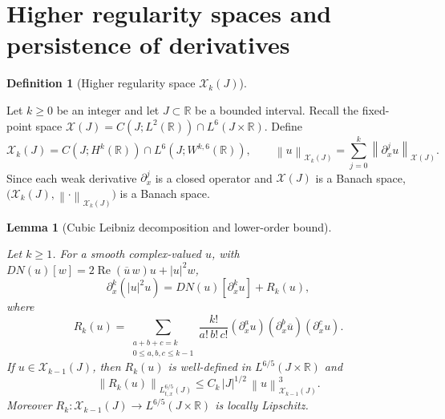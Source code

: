\documentclass[11pt,oneside]{book}
\providecommand{\uses}[1]{}
\newtheorem{lemma}[theorem]{Lemma}
\theoremstyle{definition}
\newtheorem{definition}[theorem]{Definition}
\theoremstyle{remark}
\newcommand{\R}{\mathbb R}
\newcommand{\1}{\mathbf 1}
\newcommand{\Rea}{\operatorname{Re}}
\newcommand{\norm}[1]{\left\lVert #1\right\rVert}
\begin{document}
\section{Higher regularity spaces and persistence of derivatives}

\begin{definition}[Higher regularity space $\mathcal X_k(J)$]
\label{def:Xk-space}
\uses{def:fixed-point-space, def:Hs-space}
Let $k\ge0$ be an integer and let $J\subset\R$ be a bounded interval.  Recall
the fixed-point space $\mathcal X(J)=C(J;L^2(\R))\cap L^6(J\times\R)$.  Define
\[
 \mathcal X_k(J)=C(J;H^k(\R))\cap L^6(J;W^{k,6}(\R)),
 \qquad
 \norm u_{\mathcal X_k(J)}
 =\sum_{j=0}^k\norm{\partial_x^ju}_{\mathcal X(J)}.
\]
Since each weak derivative $\partial_x^j$ is a closed operator and
$\mathcal X(J)$ is a Banach space, $\bigl(\mathcal X_k(J),\norm\cdot_{\mathcal X_k(J)}\bigr)$
is a Banach space.
\end{definition}

\begin{lemma}[Cubic Leibniz decomposition and lower-order bound]
\label{lem:cubic-Hk-leibniz}
\uses{def:Xk-space, def:scalar-mixed-norm, lem:cubic-derivative-map}
Let $k\ge1$.  For a smooth complex-valued $u$, with
$DN(u)[w]=2\Rea(\overline u\,w)u+|u|^2w$,
\begin{equation}
 \partial_x^k(|u|^2u)=DN(u)[\partial_x^ku]+R_k(u),
 \label{eq:top-derivative-split}
\end{equation}
where
\begin{equation}
 R_k(u)=
 \sum_{\substack{a+b+c=k\\0\le a,b,c\le k-1}}
 \frac{k!}{a!\,b!\,c!}
 (\partial_x^au)(\partial_x^b\overline u)(\partial_x^cu).
 \label{eq:Rk-explicit}
\end{equation}
If $u\in\mathcal X_{k-1}(J)$, then $R_k(u)$ is well-defined in
$L^{6/5}(J\times\R)$ and
\begin{equation}
 \norm{R_k(u)}_{L^{6/5}_{t,x}(J)}
 \le C_k\,|J|^{1/2}\,\norm u_{\mathcal X_{k-1}(J)}^3.
 \label{eq:Rk-bound}
\end{equation}
Moreover $R_k:\mathcal X_{k-1}(J)\to L^{6/5}(J\times\R)$ is locally Lipschitz.
\end{lemma}
\end{document}
